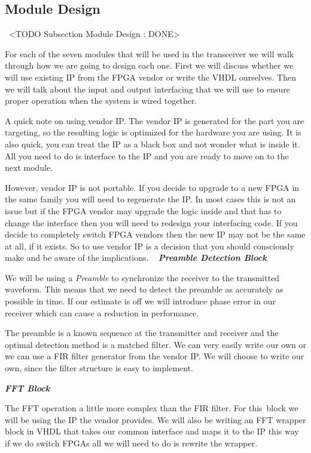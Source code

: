 \subsection{Module Design}
 <TODO Subsection Module Design : DONE>

For each of the seven modules that will be used in the transceiver we will walk through how we are going to design each one. First we will discuss whether we will use existing \ac{IP} from the \ac{FPGA} vendor or write the \ac{VHDL} ourselves. Then we will talk about the input and output interfacing that we will use to ensure proper operation when the system is wired together. 

A quick note on using vendor \ac{IP}. The vendor \ac{IP} is generated for the part you are targeting, so the resulting logic is optimized for the hardware you are using. It is also quick, you can treat the \ac{IP} as a black box and not wonder what is inside it. All you need to do is interface to the \ac{IP} and you are ready to move on to the next module.

However, vendor \ac{IP} is not portable. If you decide to upgrade to a new \ac{FPGA} in the same family you will need to regenerate the \ac{IP}. In most cases this is not an issue but if the \ac{FPGA} vendor may upgrade the logic inside and that has to change the interface then you will need to redesign your interfacing code. If you decide to completely switch \ac{FPGA} vendors then the new \ac{IP} may not be the same at all, if it exists. So to use vendor \ac{IP} is a decision that you should consciously make and be aware of the implications. 
 
{\bf \emph{Preamble Detection Block}}

We will be using a \emph{Preamble} to synchronize the receiver to the transmitted waveform. This means that we need to detect the preamble as accurately as possible in time. If our estimate is off we will introduce phase error in our receiver which can cause a reduction in performance.

The preamble is a known sequence at the transmitter and receiver and the optimal detection method is a matched filter. We can very easily write our own or we can use a \ac{FIR} filter generator from the vendor \ac{IP}. We will choose to write our own, since the filter structure is easy to implement.

{\bf \emph{\ac{FFT} Block}}

The \ac{FFT} operation a little more complex than the \ac{FIR} filter. For this block we will be using the \ac{IP} the vendor provides. We will also be writing an \ac{FFT} wrapper block in \ac{VHDL} that takes our common interface and maps it to the \ac{IP} this way if we do switch \ac{FPGA}s all we will need to do is rewrite the wrapper.

